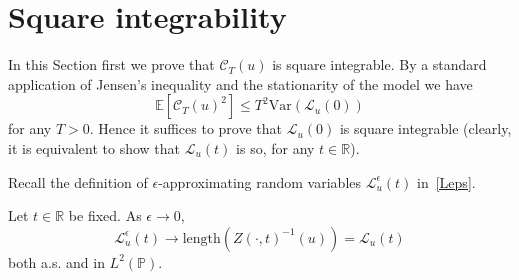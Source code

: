 \documentclass[AHL,Unicode,longabstracts,published]{cedram}
\newcommand{\clC}{\mathcal{C}}
\newcommand{\clL}{\mathcal{L}}
\newcommand{\bbR}{\mathbb{R}}
\newcommand{\bbP}{\mathbb{P}}
\newcommand{\bbE}{\mathbb{E}}
\newcommand{\rVar}{\mathrm{Var}}
\begin{document}
\section{Square integrability}
\label{app-square}

In this Section first we prove that $\clC_T(u)$ is square integrable. By a standard application of Jensen's inequality and the stationarity of the model we have
\begin{equation}
\bbE\left[\clC_T(u)^2\right] \le T^2 \rVar(\clL_u(0))
\end{equation}
for any $T>0$. Hence it suffices to prove that $\clL_u(0)$ is square integrable (clearly, it is equivalent to show that $\clL_u(t)$ is so, for any $t\in\bbR$).

Recall the definition of $\epsilon$-approximating random variables $\clL_u^\epsilon(t)$ in~\eqref{Leps}.

\begin{lemm}\label{approx2}
Let $t\in \bbR$ be fixed. As $\epsilon\to 0$,
\begin{equation}\label{convergence}
\clL_u^\epsilon(t) \to \text{length}\left(Z(\cdot, t)^{-1}(u)\right)=\clL _u(t)
\end{equation}
both a.s. and in $L^2(\bbP)$.
\end{lemm}
\end{document}
